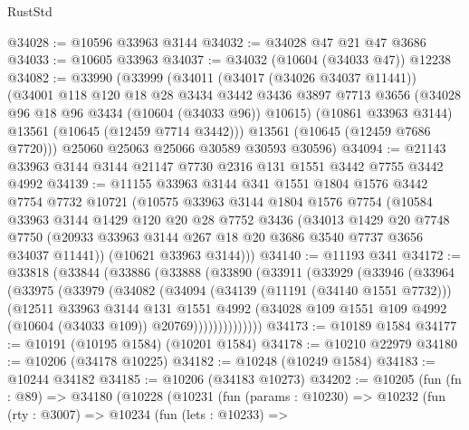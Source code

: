 \begin{lexlean}{RustStd}
\begin{coremodule}
@34028 := @10596 @33963 @3144
@34032 := @34028 @47 @21 @47 @3686
@34033 := @10605 @33963
@34037 := @34032 (@10604 (@34033 @47)) @12238
@34082 := @33990
    (@33999
      (@34011
        (@34017 (@34026 @34037 @11441))
        (@34001
          @118
          @120
          @18
          @28
          @3434
          @3442
          @3436
          @3897
          @7713
          @3656
          (@34028 @96 @18 @96 @3434 (@10604 (@34033 @96)) @10615)
          (@10861 @33963 @3144)
          @13561
          (@10645 (@12459 @7714 @3442)))
        @13561
        (@10645 (@12459 @7686 @7720)))
      @25060
      @25063
      @25066
      @30589
      @30593
      @30596)
@34094 := @21143 @33963 @3144 @3144 @21147 @7730 @2316 @131 @1551 @3442 @7755 @3442 @4992
@34139 := @11155
    @33963
    @3144
    @341
    @1551
    @1804
    @1576
    @3442
    @7754
    @7732
    @10721
    (@10575
      @33963
      @3144
      @1804
      @1576
      @7754
      (@10584
        @33963
        @3144
        @1429
        @120
        @20
        @28
        @7752
        @3436
        (@34013
          @1429
          @20
          @7748
          @7750
          (@20933 @33963 @3144 @267 @18 @20 @3686 @3540 @7737 @3656 @34037 @11441))
        (@10621 @33963 @3144)))
@34140 := @11193 @341
@34172 := @33818
    (@33844
      (@33886
        (@33888
          (@33890
            (@33911
              (@33929
                (@33946
                  (@33964
                    (@33975
                      (@33979
                        (@34082
                          (@34094
                            (@34139 (@11191 (@34140 @1551 @7732)))
                            (@12511
                              @33963
                              @3144
                              @131
                              @1551
                              @4992
                              (@34028
                                @109
                                @1551
                                @109
                                @4992
                                (@10604 (@34033 @109))
                                @20769))))))))))))))
@34173 := @10189 @1584
@34177 := @10191 (@10195 @1584) (@10201 @1584)
@34178 := @10210 @22979
@34180 := @10206 (@34178 @10225)
@34182 := @10248 (@10249 @1584)
@34183 := @10244 @34182
@34185 := @10206 (@34183 @10273)
@34202 := @10205
    (fun (fn : @89) =>
    @34180
      (@10228
        (@10231
          (fun (params : @10230) =>
          @10232
            (fun (rty : @3007) =>
            @10234
              (fun (lets : @10233) =>

\end{coremodule}
\end{lexlean}
